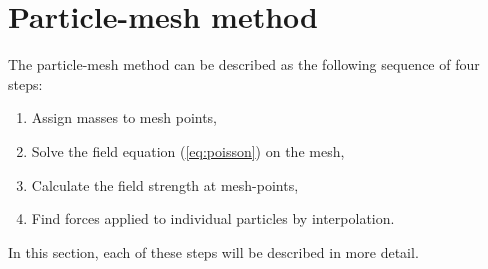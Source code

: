 \chapter{Particle-mesh method}
The particle-mesh method can be described as the following sequence of four steps:
\begin{enumerate}
    \item Assign masses to mesh points,
    \item Solve the field equation (\autoref{eq:poisson}) on the mesh,
    \item Calculate the field strength at mesh-points,
    \item Find forces applied to individual particles by interpolation.
\end{enumerate}
In this section, each of these steps will be described in more detail.







